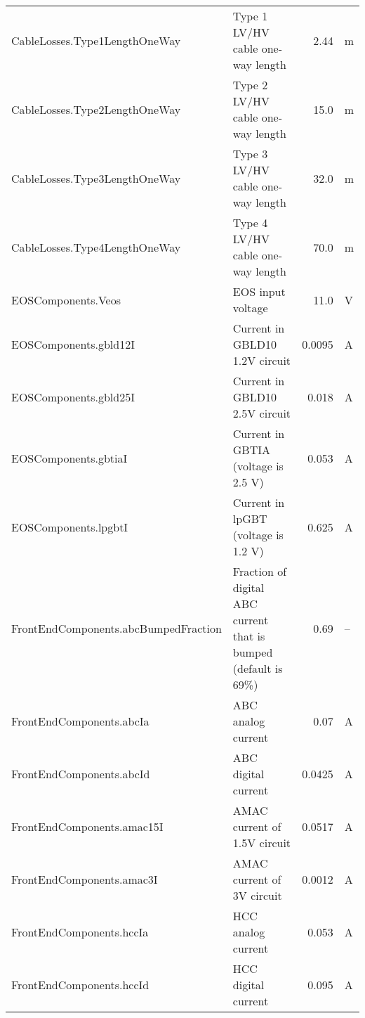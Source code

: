 \begin{table}[ht]
\begin{centering}
{\begin{tabular}{|l|l|r|l|}
CableLosses.Type1LengthOneWay        & Type 1 LV/HV cable one-way length                            &       2.44 & m           \\ 
CableLosses.Type2LengthOneWay        & Type 2 LV/HV cable one-way length                            &       15.0 & m           \\ 
CableLosses.Type3LengthOneWay        & Type 3 LV/HV cable one-way length                            &       32.0 & m           \\ 
CableLosses.Type4LengthOneWay        & Type 4 LV/HV cable one-way length                            &       70.0 & m           \\ 
EOSComponents.Veos                   & EOS input voltage                                            &       11.0 & V           \\ 
EOSComponents.gbld12I                & Current in GBLD10 1.2V circuit                               &     0.0095 & A           \\ 
EOSComponents.gbld25I                & Current in GBLD10 2.5V circuit                               &      0.018 & A           \\ 
EOSComponents.gbtiaI                 & Current in GBTIA (voltage is 2.5 V)                          &      0.053 & A           \\ 
EOSComponents.lpgbtI                 & Current in lpGBT (voltage is 1.2 V)                          &      0.625 & A           \\ 
FrontEndComponents.abcBumpedFraction & Fraction of digital ABC current that is bumped (default is 69\%) &       0.69 & --          \\ 
FrontEndComponents.abcIa             & ABC analog current                                           &       0.07 & A           \\ 
FrontEndComponents.abcId             & ABC digital current                                          &     0.0425 & A           \\ 
FrontEndComponents.amac15I           & AMAC current of 1.5V circuit                                 &     0.0517 & A           \\ 
FrontEndComponents.amac3I            & AMAC current of 3V circuit                                   &     0.0012 & A           \\ 
FrontEndComponents.hccIa             & HCC analog current                                           &      0.053 & A           \\ 
FrontEndComponents.hccId             & HCC digital current                                          &      0.095 & A           \\ 

\end{tabular}}
\end{centering}
\end{table}
